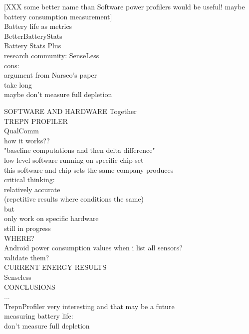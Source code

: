 [XXX some better name than Software power profilers would be useful!
 maybe battery consumption measurement]\\

Battery life as metrics\\
	BetterBatteryStats\\
	Battery Stats Plus\\
	research community: SenseLess\cite{benabdesslem:senseless}\\
	cons:\\
		argument from Narseo's paper\\
		take long\\
			maybe don't measure full depletion
	
	
	
SOFTWARE AND HARDWARE Together\\
	TREPN PROFILER\cite{qualcomm:trepnprofiler}\\
		QualComm\\
		how it works??\\
			"baseline computations and then delta difference"\\	
			low level software running on specific chip-set\\
				this software and chip-sets the same company produces\\
		critical thinking:\\
			relatively accurate\\
				(repetitive results where conditions the same)\\
			but\\
				only work on specific hardware \\
				still in progress\\
		
WHERE?\\
	Android power consumption values when i list all sensors?\\
		validate them?\\

CURRENT ENERGY RESULTS\\
	Senseless\cite{benabdesslem:senseless}\\
	

CONCLUSIONS\\
	...\\
	TrepnProfiler very interesting and that may be a future\\
	measuring battery life:\\
		 don't measure full depletion\\


